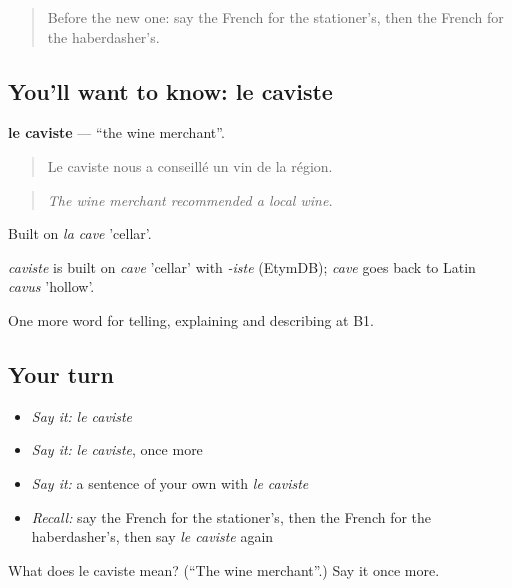 \label{lesson:FR-C445-caviste}



\begin{quote}
Before the new one: say the French for the stationer’s, then the French for the haberdasher’s.
\end{quote}

\subsection*{You'll want to know: le caviste}
\textbf{le caviste} — \textquotedblleft{}the wine merchant\textquotedblright{}.

\begin{quote}
Le caviste nous a conseillé un vin de la région.
\end{quote}

\begin{quote}
\emph{The wine merchant recommended a local wine.}
\end{quote}

Built on \emph{la cave} 'cellar'.

\begin{cousinweb}
\emph{caviste} is built on \emph{cave} 'cellar' with \emph{-iste} (EtymDB); \emph{cave} goes back to Latin \emph{cavus} 'hollow'.
\end{cousinweb}

\begin{grammarlens}[title={What you've built}]
One more word for telling, explaining and describing at B1.
\end{grammarlens}

\subsection*{Your turn}
\begin{itemize}
\raggedright
  \item \emph{Say it:} \emph{le caviste}
  \item \emph{Say it:} \emph{le caviste}, once more
  \item \emph{Say it:} a sentence of your own with \emph{le caviste}
  \item \emph{Recall:} say the French for the stationer’s, then the French for the haberdasher’s, then say \emph{le caviste} again
\end{itemize}

\begin{tcolorbox}[breakable,colback=teal!4,colframe=teal!35!black,title={Before you move on}]
What does le caviste mean? (\textquotedblleft{}The wine merchant\textquotedblright{}.) Say it once more.
\end{tcolorbox}
